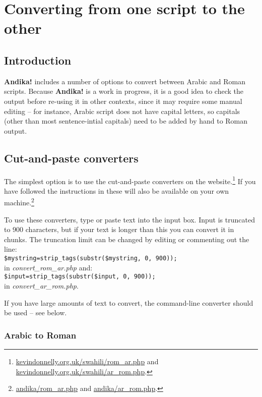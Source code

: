 \chapter{Converting from one script to the other}
\label{ch:conversion}

\section{Introduction}

\textbf{Andika!} includes a number of options to convert between Arabic and Roman scripts.  Because \textbf{Andika!} is a work in progress, it is a good idea to check the output before re-using it in other contexts, since it may require some manual editing -- for instance, Arabic script does not have capital letters, so capitals (other than most sentence-intial capitals) need to be added by hand to Roman output.

\section{Cut-and-paste converters}

The simplest option is to use the cut-and-paste converters on the website.\footnote{\url{kevindonnelly.org.uk/swahili/rom_ar.php} and \url{kevindonnelly.org.uk/swahili/ar_rom.php}.}  If you have followed the instructions in  these will also be available on your own machine.\footnote{\url{andika/rom_ar.php} and \url{andika/ar_rom.php}.}

To use these converters, type or paste text into the input box.  Input is truncated to 900 characters, but if your text is longer than this you can convert it in chunks.  The truncation limit can be changed by editing or commenting out the line: \\
\verb|$mystring=strip_tags(substr($mystring, 0, 900));| \\
in \textit{convert_rom_ar.php} and: \\
\verb|$input=strip_tags(substr($input, 0, 900));| \\
in \textit{convert_ar_rom.php}.

If you have large amounts of text to convert, the command-line converter should be used -- see  below.

\subsection{Arabic to Roman}

